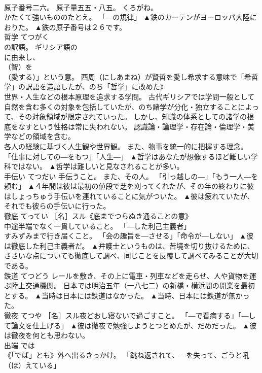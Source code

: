 \documentclass[8pt]{extreport}
\begin{document}
\begin{CJK}{UTF8}{min}
\\	原子番号二六。 原子量五五・八五。 くろがね。 
\\	かたくて強いもののたとえ。 「―の規律」	▲鉄のカーテンがヨーロッパ大陸におりた。 ▲鉄の原子番号は２６です。
\\	哲学	てつがく	
\\	の訳語。 ギリシア語の
\\	に由来し、
\\	（智）を
\\	（愛する）」という意。 西周（にしあまね）が賢哲を愛し希求する意味で「希哲学」の訳語を造語したが、のち「哲学」に改めた》 
\\	世界・人生などの根本原理を追求する学問。 古代ギリシアでは学問一般として自然を含む多くの対象を包括していたが、のち諸学が分化・独立することによって、その対象領域が限定されていった。 しかし、知識の体系としての諸学の根底をなすという性格は常に失われない。 認識論・論理学・存在論・倫理学・美学などの領域を含む。 
\\	各人の経験に基づく人生観や世界観。 また、物事を統一的に把握する理念。 「仕事に対しての―をもつ」「人生―」	▲哲学はあなたが想像するほど難しい学科ではない。 ▲哲学は難しいと見なされることが多い。
\\	手伝い	てつだい	手伝うこと。 また、その人。 「引っ越しの―」「もう一人―を頼む」	▲４年間は彼は最初の値段で芝を刈ってくれたが、その年の終わりに彼はしょっちゅう手伝いを連れていることに気がついた。 ▲彼は疲れていたが、それでも彼らの手伝いに行った。
\\	徹底	てってい	［名］スル《底までつらぬき通ることの意》 
\\	中途半端でなく一貫していること。 「―した利己主義者」 
\\	すみずみまで行き届くこと。 「会の趣旨を―させる」「命令が―しない」	▲彼は徹底した利己主義者だ。 ▲弁護士というものは、苦境を切り抜けるために、ささいな点についても徹底して調べ、同じことを反覆して調べてみることが大切である。
\\	鉄道	てつどう	レールを敷き、その上に電車・列車などを走らせ、人や貨物を運ぶ陸上交通機関。 日本では明治五年（一八七二）の新橋・横浜間の開業を最初とする。	▲当時は日本には鉄道はなかった。 ▲当時、日本には鉄道が無かった。
\\	徹夜	てつや	［名］スル夜どおし寝ないで過ごすこと。 「―で看病する」「―して論文を仕上げる」	▲彼は徹夜で勉強しようとつとめたが、だめだった。 ▲彼は徹夜を何とも思わない。
\\	出端	では	
\\	《「でば」とも》外へ出るきっかけ。 「跳ね返されて、―を失って、ごうと吼（ほ）えている」 

\end{CJK}
\end{document}
